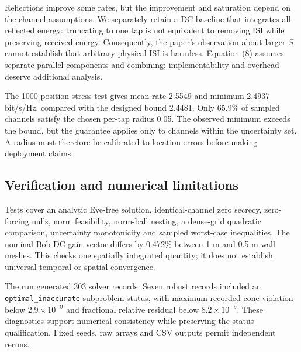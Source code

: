 \documentclass[conference]{IEEEtran}
\begin{document}
Reflections improve some rates, but the improvement and saturation depend on the channel assumptions. We separately retain a DC baseline that integrates all reflected energy: truncating to one tap is not equivalent to removing ISI while preserving received energy. Consequently, the paper's observation about larger $S$ cannot establish that arbitrary physical ISI is harmless. Equation (8) assumes separate parallel components and combining; implementability and overhead deserve additional analysis.

The 1000-position stress test gives mean rate 2.5549 and minimum 2.4937 bit/s/Hz, compared with the designed bound 2.4481. Only 65.9\% of sampled channels satisfy the chosen per-tap radius 0.05. The observed minimum exceeds the bound, but the guarantee applies only to channels within the uncertainty set. A radius must therefore be calibrated to location errors before making deployment claims.

\subsection{Verification and numerical limitations}
Tests cover an analytic Eve-free solution, identical-channel zero secrecy, zero-forcing nulls, norm feasibility, norm-ball nesting, a dense-grid quadratic comparison, uncertainty monotonicity and sampled worst-case inequalities. The nominal Bob DC-gain vector differs by 0.472\% between 1 m and 0.5 m wall meshes. This checks one spatially integrated quantity; it does not establish universal temporal or spatial convergence.

The run generated 303 solver records. Seven robust records included an \texttt{optimal\_inaccurate} subproblem status, with maximum recorded cone violation below $2.9\times10^{-9}$ and fractional relative residual below $8.2\times10^{-9}$. These diagnostics support numerical consistency while preserving the status qualification. Fixed seeds, raw arrays and CSV outputs permit independent reruns.
\end{document}
